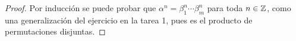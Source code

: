 \begin{enumerate}[(i)]

        \begin{proof}
            Por inducción se puede probar que \( \alpha^n = \beta_1^n \cdots \beta_m^n \) para
            toda \( n\in \mathbb{Z} \), como una generalización del ejercicio en la tarea 1,
            pues es el producto de permutaciones disjuntas.


\end{proof}
\end{enumerate}
